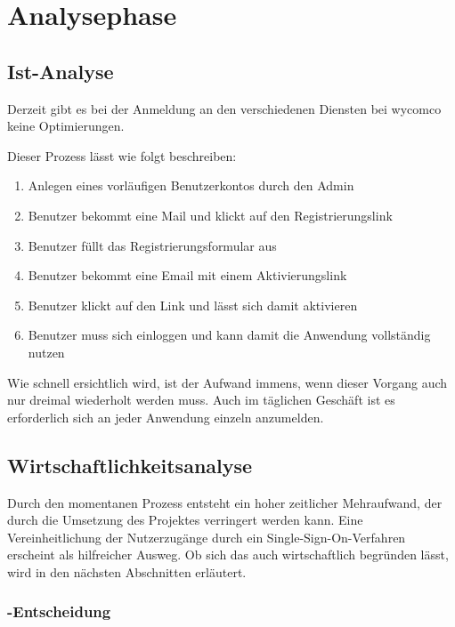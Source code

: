 \section{Analysephase} 
\label{sec:Analysephase}


\subsection{Ist-Analyse} 
\label{sec:IstAnalyse}

Derzeit gibt es bei der Anmeldung an den verschiedenen Diensten bei wycomco keine Optimierungen. 

Dieser Prozess lässt wie folgt beschreiben:
\begin{enumerate}
	\item Anlegen eines vorläufigen Benutzerkontos durch den Admin
	\item Benutzer bekommt eine Mail und klickt auf den Registrierungslink
	\item Benutzer füllt das Registrierungsformular aus
	\item Benutzer bekommt eine Email mit einem Aktivierungslink
	\item Benutzer klickt auf den Link und lässt sich damit aktivieren
	\item Benutzer muss sich einloggen und kann damit die Anwendung vollständig nutzen
\end{enumerate}

Wie schnell ersichtlich wird, ist der Aufwand immens, wenn dieser Vorgang auch nur dreimal wiederholt werden muss.
Auch im täglichen Geschäft ist es erforderlich sich an jeder Anwendung einzeln anzumelden.

\subsection{Wirtschaftlichkeitsanalyse}
\label{sec:Wirtschaftlichkeitsanalyse}

Durch den momentanen Prozess entsteht ein hoher zeitlicher Mehraufwand, der durch die Umsetzung des Projektes verringert werden kann.
Eine Vereinheitlichung der Nutzerzugänge durch ein Single-Sign-On-Verfahren erscheint als hilfreicher Ausweg.
Ob sich das auch wirtschaftlich begründen lässt, wird in den nächsten Abschnitten erläutert.

\subsubsection{-Entscheidung}
\label{sec:MakeOrBuyEntscheidung}


